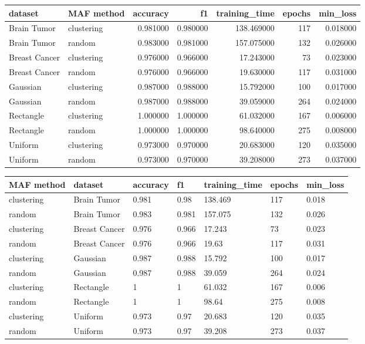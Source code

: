 \begin{tabular}{llrrrrr}
\toprule
dataset & MAF method & accuracy & f1 & training_time & epochs & min_loss \\
\midrule
Brain Tumor & clustering & 0.981000 & 0.980000 & 138.469000 & 117 & 0.018000 \\
Brain Tumor & random & 0.983000 & 0.981000 & 157.075000 & 132 & 0.026000 \\
Breast Cancer & clustering & 0.976000 & 0.966000 & 17.243000 & 73 & 0.023000 \\
Breast Cancer & random & 0.976000 & 0.966000 & 19.630000 & 117 & 0.031000 \\
Gaussian & clustering & 0.987000 & 0.988000 & 15.792000 & 100 & 0.017000 \\
Gaussian & random & 0.987000 & 0.988000 & 39.059000 & 264 & 0.024000 \\
Rectangle & clustering & 1.000000 & 1.000000 & 61.032000 & 167 & 0.006000 \\
Rectangle & random & 1.000000 & 1.000000 & 98.640000 & 275 & 0.008000 \\
Uniform & clustering & 0.973000 & 0.970000 & 20.683000 & 120 & 0.035000 \\
Uniform & random & 0.973000 & 0.970000 & 39.208000 & 273 & 0.037000 \\
\bottomrule
\end{tabular}


\begin{tabular}{llllll}
\toprule
MAF method & dataset & accuracy & f1 & training\_time & epochs & min\_loss \\
\midrule
clustering & Brain Tumor & 0.981 & 0.98 & 138.469 & 117 & 0.018 \\
random & Brain Tumor & 0.983 & 0.981 & 157.075 & 132 & 0.026 \\
clustering & Breast Cancer & 0.976 & 0.966 & 17.243 & 73 & 0.023 \\
random & Breast Cancer & 0.976 & 0.966 & 19.63 & 117 & 0.031 \\
clustering & Gaussian & 0.987 & 0.988 & 15.792 & 100 & 0.017 \\
random & Gaussian & 0.987 & 0.988 & 39.059 & 264 & 0.024 \\
clustering & Rectangle & 1 & 1 & 61.032 & 167 & 0.006 \\
random & Rectangle & 1 & 1 & 98.64 & 275 & 0.008 \\
clustering & Uniform & 0.973 & 0.97 & 20.683 & 120 & 0.035 \\
random & Uniform & 0.973 & 0.97 & 39.208 & 273 & 0.037 \\
\bottomrule
\end{tabular}

    